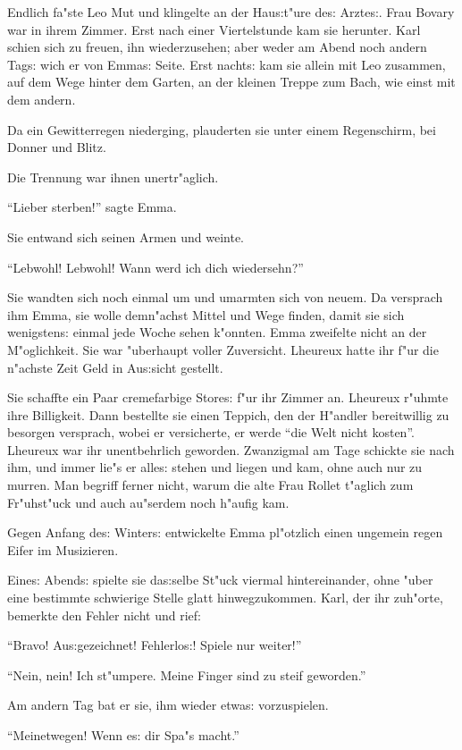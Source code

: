 \documentclass[oneside,12pt]{book}
\newcommand{\s}{s:}%
\begin{document}
Endlich fa"ste Leo Mut und klingelte an der Hau{\s}t"ure de{\s}
Arzte{\s}. Frau Bovary war in ihrem Zimmer. Erst nach einer
Viertelstunde kam sie herunter. Karl schien sich zu freuen, ihn
wiederzusehen; aber weder am Abend noch andern Tag{\s} wich er von
Emma{\s} Seite. Erst nacht{\s} kam sie allein mit Leo zusammen,
auf dem Wege hinter dem Garten, an der kleinen Treppe zum Bach,
wie einst mit dem andern.

Da ein Gewitterregen niederging, plauderten sie unter einem
Regenschirm, bei Donner und Blitz.

Die Trennung war ihnen unertr"aglich.

"`Lieber sterben!"' sagte Emma.

Sie entwand sich seinen Armen und weinte.

"`Lebwohl! Lebwohl! Wann werd ich dich wiedersehn?"'

Sie wandten sich noch einmal um und umarmten sich von neuem. Da
versprach ihm Emma, sie wolle demn"achst Mittel und Wege finden,
damit sie sich wenigsten{\s} einmal jede Woche sehen k"onnten.
Emma zweifelte nicht an der M"oglichkeit. Sie war "uberhaupt
voller Zuversicht. Lheureux hatte ihr f"ur die n"achste Zeit Geld
in Au{\s}sicht gestellt.

Sie schaffte ein Paar cremefarbige Store{\s} f"ur ihr Zimmer an.
Lheureux r"uhmte ihre Billigkeit. Dann bestellte sie einen
Teppich, den der H"andler bereitwillig zu besorgen versprach,
wobei er versicherte, er werde "`die Welt nicht kosten"'. Lheureux
war ihr unentbehrlich geworden. Zwanzigmal am Tage schickte sie
nach ihm, und immer lie"s er alle{\s} stehen und liegen und kam,
ohne auch nur zu murren. Man begriff ferner nicht, warum die alte
Frau Rollet t"aglich zum Fr"uhst"uck und auch au"serdem noch
h"aufig kam.

Gegen Anfang de{\s} Winter{\s} entwickelte Emma pl"otzlich einen
ungemein regen Eifer im Musizieren.

Eine{\s} Abend{\s} spielte sie da{\s}selbe St"uck viermal
hintereinander, ohne "uber eine bestimmte schwierige Stelle glatt
hinwegzukommen. Karl, der ihr zuh"orte, bemerkte den Fehler nicht
und rief:

"`Bravo! Au{\s}gezeichnet! Fehlerlo{\s}! Spiele nur weiter!"'

"`Nein, nein! Ich st"umpere. Meine Finger sind zu steif
geworden."'

Am andern Tag bat er sie, ihm wieder etwa{\s} vorzuspielen.

"`Meinetwegen! Wenn e{\s} dir Spa"s macht."'
\end{document}

